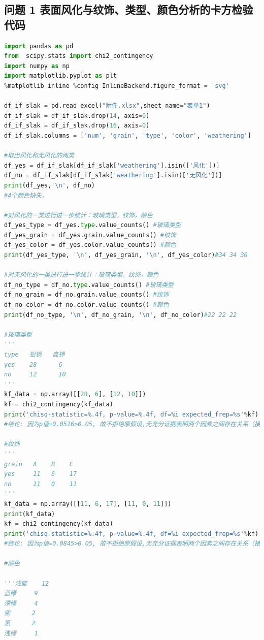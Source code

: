 \documentclass[withoutpreface,bwprint]{cumcmthesis} %
\begin{document}
\begin{appendices}
\section{问题 1 表面风化与纹饰、类型、颜色分析的卡方检验代码}
\begin{lstlisting}[language=Python]
import pandas as pd 
from  scipy.stats import chi2_contingency
import numpy as np
import matplotlib.pyplot as plt
%matplotlib inline %config InlineBackend.figure_format = 'svg'

df_if_slak = pd.read_excel("附件.xlsx",sheet_name="表单1")
df_if_slak = df_if_slak.drop(14, axis=0)
df_if_slak = df_if_slak.drop(16, axis=0)
df_if_slak.columns = ['num', 'grain', 'type', 'color', 'weathering']

#取出风化和无风化的两类
df_yes = df_if_slak[df_if_slak['weathering'].isin(['风化'])]
df_no = df_if_slak[df_if_slak['weathering'].isin(['无风化'])]
print(df_yes,'\n', df_no)
#4个颜色缺失，

#对风化的一类进行进一步统计：玻璃类型，纹饰，颜色
df_yes_type = df_yes.type.value_counts() #玻璃类型
df_yes_grain = df_yes.grain.value_counts() #纹饰
df_yes_color = df_yes.color.value_counts() #颜色
print(df_yes_type, '\n', df_yes_grain, '\n', df_yes_color)#34 34 30

#对无风化的一类进行进一步统计：玻璃类型，纹饰，颜色
df_no_type = df_no.type.value_counts() #玻璃类型
df_no_grain = df_no.grain.value_counts() #纹饰
df_no_color = df_no.color.value_counts() #颜色
print(df_no_type, '\n', df_no_grain, '\n', df_no_color)#22 22 22

#玻璃类型
'''
type   铅钡   高钾
yes    28      6
no     12      10
'''
kf_data = np.array([[28, 6], [12, 10]])
kf = chi2_contingency(kf_data)
print('chisq-statistic=%.4f, p-value=%.4f, df=%i expected_frep=%s'%kf)
#结论: 因为p值=0.0516>0.05, 故不拒绝原假设,无充分证据表明两个因素之间存在关系（接受原假设, 认为玻璃类型和是否风化无显著差别。）

#纹饰
'''
grain   A    B    C
yes     11   6    17
no      11   0    11
'''
kf_data = np.array([[11, 6, 17], [11, 0, 11]])
print(kf_data)
kf = chi2_contingency(kf_data)
print('chisq-statistic=%.4f, p-value=%.4f, df=%i expected_frep=%s'%kf)
#结论: 因为p值=0.0845>0.05, 故不拒绝原假设,无充分证据表明两个因素之间存在关系（接受原假设, 认为玻璃纹饰和是否风化无显著差别。）

#颜色
    
'''浅蓝    12
蓝绿     9
深绿     4
紫      2
黑      2
浅绿     1


\end{lstlisting}
\end{appendices}
\end{document}
